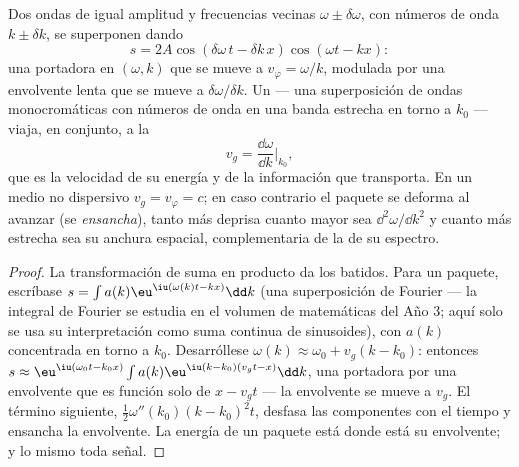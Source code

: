 \begin{proposition}\label{prop:b2:dispersion-wave-packets:group}
Dos ondas de igual amplitud y frecuencias vecinas $\omega \pm
\delta\omega$, con números de onda $k \pm \delta k$, se superponen dando
\[
s = 2A\cos(\delta\omega\,t - \delta k\,x)\cos(\omega t - kx) :
\]
una portadora en $(\omega, k)$ que se mueve a $v_\varphi = \omega/k$, modulada por
una envolvente lenta que se mueve a $\delta\omega/\delta k$. Un \emph{} --- una superposición de ondas monocromáticas con números de onda
en una banda estrecha en torno a $k_0$ --- viaja, en conjunto, a la \emph{}
\[
v_g = \frac{\dd\omega}{\dd k}\Bigr|_{k_0} ,
\]
que es la velocidad de su energía y de la información que transporta.
En un medio no dispersivo $v_g = v_\varphi = c$; en caso contrario el paquete
se deforma al avanzar (se \emph{ensancha}), tanto más deprisa cuanto mayor
sea $\dd^2\omega/\dd k^2$ y cuanto más estrecha sea su anchura espacial,
complementaria de la de su espectro.
\end{proposition}

\begin{proof}
La transformación de suma en producto da los batidos. Para un paquete, escríbase $s =
\int a(k)\eu^{\iu(\omega(k)t - kx)}\dd k$ (una superposición de Fourier --- la
integral de Fourier se estudia en el volumen de matemáticas del Año 3;
aquí solo se usa su interpretación como suma continua de sinusoides), con
$a(k)$ concentrada en torno a $k_0$. Desarróllese $\omega(k) \approx \omega_0 + v_g(k - k_0)$: entonces
$s \approx \eu^{\iu(\omega_0t - k_0x)}\int a(k)\eu^{\iu(k - k_0)(v_gt - x)}\dd k$, una
portadora por una envolvente que es función solo de $x - v_gt$ --- la
envolvente se mueve a $v_g$. El término siguiente, $\tfrac12\omega''(k_0)(k - k_0)^2t$,
desfasa las componentes con el tiempo y ensancha la envolvente. La energía
de un paquete está donde está su envolvente; y lo mismo toda señal.
\end{proof}

